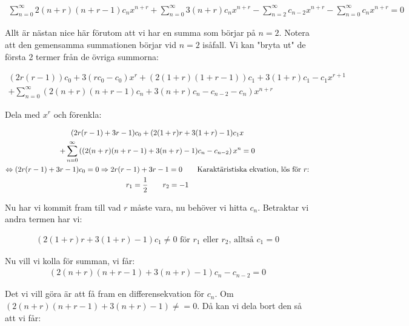\begin{equation*}
  \begin{gathered}
    \sum_{n=0}^{\infty}2(n+r)(n+r-1)c_nx^{n+r}+\sum_{n=0}^{\infty}3(n+r)c_nx^{n+r}-\sum_{n=2}^{\infty}c_{n-2}x^{n+r}-\sum_{n=0}^{\infty}c_nx^{n+r}=0
  \end{gathered}
\end{equation*}\par
\noindent Allt är nästan nice här förutom att vi har en summa som börjar på $n=2$. Notera att den gemensamma summationen börjar vid $n=2$ isåfall. Vi kan "bryta ut" de första 2 termer från de övriga summorna:
\par\bigskip
\begin{equation*}
  \begin{gathered}
    (2r(r-1))c_0+3(rc_0-c_0)x^r+(2(1+r)(1+r-1))c_1+3(1+r)c_1-c_1x^{r+1}\\
    +\sum_{n=0}^{\infty}\left(2(n+r)(n+r-1)c_n+3(n+r)c_n-c_{n-2}-c_n\right)x^{n+r}
  \end{gathered}
\end{equation*}
\par\bigskip
\noindent Dela med $x^r$ och förenkla:

\begin{equation*}
  \begin{gathered}
    (2r(r-1)+3r-1)c_0+(2(1+r)r+3(1+r)-1)c_1x\\
    +\sum_{n=0}^{\infty}\left((2(n+r)(n+r-1)+3(n+r)-1)c_n-c_{n-2}\right)x^n=0\\
    \Leftrightarrow (2r(r-1)+3r-1)c_0 = 0 \Rightarrow 2r(r-1)+3r-1 = 0 \text{\qquad Karaktäristiska ekvation, lös för $r$:}\\
    r_1 = \dfrac{1}{2}\qquad r_2=-1
  \end{gathered}
\end{equation*}
\par\bigskip
\noindent Nu har vi kommit fram till vad $r$ måste vara, nu behöver vi hitta $c_n$. Betraktar vi andra termen har vi:

\begin{equation*}
  \begin{gathered}
    (2(1+r)r+3(1+r)-1)c_1\neq0 \text{ för $r_1$ eller $r_2$, alltså $c_1=0$}
  \end{gathered}
\end{equation*}
\par\bigskip
\noindent Nu vill vi kolla för summan, vi får:
\begin{equation*}
  \begin{gathered}
    (2(n+r)(n+r-1)+3(n+r)-1)c_n-c_{n-2}=0
  \end{gathered}
\end{equation*}
\par\bigskip
\noindent Det vi vill göra är att få fram en differensekvation för $c_n$. Om $(2(n+r)(n+r-1)+3(n+r)-1)\neq=0$. Då kan vi dela bort den så att vi får:

